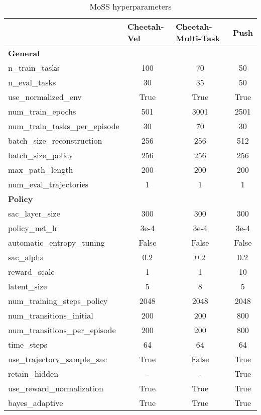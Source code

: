 \documentclass[letterpaper]{article} %
\begin{document}
\begin{table*}[t]
\label{tab:hyperparameters}
  \centering
  \caption{MoSS hyperparameters}
    \begin{tabular}{lccc}
    \toprule
          & \multicolumn{1}{l}{Cheetah-Vel} & \multicolumn{1}{l}{Cheetah-Multi-Task} & \multicolumn{1}{l}{Push}\\
    \midrule
       \textbf{General} &       &       &  \\
    \midrule
    n\_train\_tasks & 100   & 70    & 50 \\
    n\_eval\_tasks & 30    & 35    & 50 \\
    use\_normalized\_env & True     & True     & True \\
    num\_train\_epochs & 501   & 3001  & 2501 \\
    num\_train\_tasks\_per\_episode & 30    & 70    & 30 \\
    batch\_size\_reconstruction & 256   & 256   & 512 \\
    batch\_size\_policy & 256   & 256   & 256 \\
    max\_path\_length & 200   & 200   & 200 \\
    num\_eval\_trajectories & 1     & 1     & 1 \\
    \midrule
    \textbf{Policy} &       &       &  \\
    \midrule
    sac\_layer\_size & 300   & 300   & 300 \\
    policy\_net\_lr & 3e-4 & 3e-4 & 3e-4 \\
    automatic\_entropy\_tuning & False    & False    & False\\
    sac\_alpha & 0.2   & 0.2   & 0.2 \\
    reward\_scale & 1     & 1     & 10 \\
    latent\_size & 5     & 8     & 5 \\
    num\_training\_steps\_policy & 2048  & 2048  & 2048 \\
    num\_transitions\_initial & 200   & 200   & 800 \\
    num\_transitions\_per\_episode & 200   & 200   & 800 \\
    time\_steps & 64    & 64    & 64 \\
    use\_trajectory\_sample\_sac & True    & False    & True\\
    retain\_hidden & -   & -   & True\\
    use\_reward\_normalization & True    & True    & True\\
    bayes\_adaptive & True    & True    & True\\

\end{tabular}
\end{table*}
\end{document}
